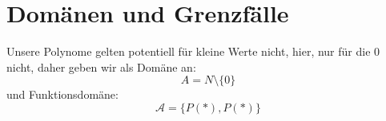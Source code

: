 \documentclass{article}
\begin{document}
	\section{Dom\"anen und Grenzf\"alle}
	Unsere Polynome gelten potentiell f\"ur kleine Werte nicht, hier, nur f\"ur die 0 nicht, daher geben wir als Dom\"ane an:
	\[ A = N\setminus\{0\} \]
und Funktionsdom\"ane:\\
	\[\mathcal{A} = \{P(*),P(*)\}\]
	
	
	
	
	
	
	
	
	
	
	
	
	
	
	
	
	
	
	
	
	
	
	
	
\end{document}

